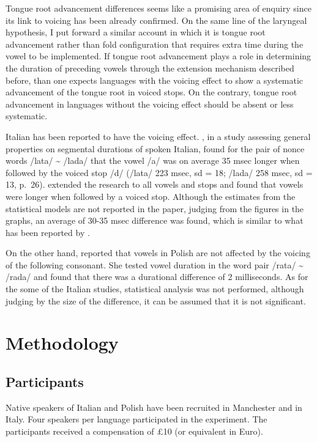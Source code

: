 \documentclass[]{elsarticle}
\begin{document}
Tongue root advancement differences seems like a promising area of
enquiry since its link to voicing has been already confirmed. On the
same line of the laryngeal hypothesis, I put forward a similar account
in which it is tongue root advancement rather than fold configuration
that requires extra time during the vowel to be implemented. If tongue
root advancement plays a role in determining the duration of preceding
vowels through the extension mechanism described before, than one
expects languages with the voicing effect to show a systematic
advancement of the tongue root in voiced stops. On the contrary, tongue
root advancement in languages without the voicing effect should be
absent or less systematic.

Italian has been reported to have the voicing effect.
\citet{farnetani1986}, in a study assessing general properties on
segmental durations of spoken Italian, found for the pair of nonce words
/lata/ \textasciitilde{} /lada/ that the vowel /a/ was on average 35
msec longer when followed by the voiced stop /d/ (/lata/ 223 msec, sd =
18; /lada/ 258 msec, sd = 13, p.~26). \citet{esposito2002} extended the
research to all vowels and stops and found that vowels were longer when
followed by a voiced stop. Although the estimates from the statistical
models are not reported in the paper, judging from the figures in the
graphs, an average of 30-35 msec difference was found, which is similar
to what has been reported by \citet{farnetani1986}.

On the other hand, \citet{keating1984} reported that vowels in Polish
are not affected by the voicing of the following consonant. She tested
vowel duration in the word pair /rata/ \textasciitilde{} /rada/ and
found that there was a durational difference of 2 milliseconds. As for
the some of the Italian studies, statistical analysis was not performed,
although judging by the size of the difference, it can be assumed that
it is not significant.

\section{Methodology}\label{methodology}

\subsection{Participants}\label{participants}

Native speakers of Italian and Polish have been recruited in Manchester
and in Italy. Four speakers per language participated in the experiment.
The participants received a compensation of £10 (or equivalent in Euro).
\end{document}
